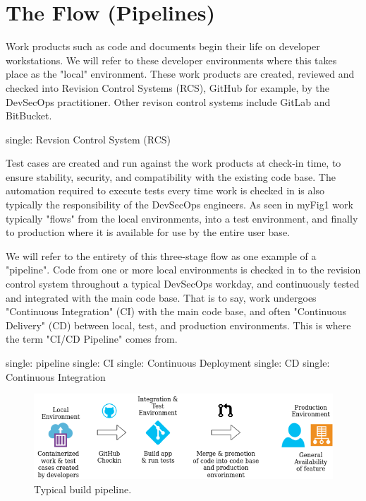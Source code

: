 \section{The Flow (Pipelines)}

\justify
Work products such as code and documents begin their life on developer workstations. We will refer to these developer environments where this takes place as the "local" environment. These work products are created, reviewed and checked into Revision Control Systems (RCS), GitHub for example, by the DevSecOps practitioner. Other revison control systems include GitLab and BitBucket.

single: Revsion Control System (RCS)

\justify
Test cases are created and run against the work products at check-in time, to ensure stability, security, and compatibility with the existing code base. The automation required to execute tests every time work is checked in is also typically the responsibility of the DevSecOps engineers. As seen in {myFig1} work typically "flows" from the local environments, into a test environment, and finally to production where
it is available for use by the entire user base.

\justify
We will refer to the entirety of this three-stage flow as one example of
a "pipeline". Code from one or more local environments is checked in to
the revision control system throughout a typical DevSecOps workday, and
continuously tested and integrated with the main code base. That is to
say, work undergoes "Continuous Integration" (CI) with the main code base, and often "Continuous Delivery" (CD) between local, test, and production environments. This is where the term "CI/CD Pipeline" comes from.

single: pipeline single: CI single: Continuous Deployment single: CD
single: Continuous Integration

\begin{figure}
\centering
\includegraphics{../images/flow.png}
\caption{Typical build pipeline.}
\end{figure}

